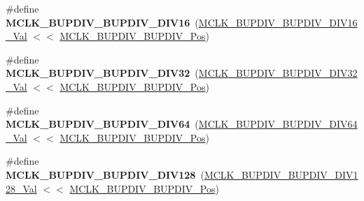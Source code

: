 \begin{DoxyCompactItemize}
\item 
\hypertarget{group___s_a_m_l21___m_c_l_k_ga5e6c89fac09e41e6353db9dd809242c8}{}\#define {\bfseries M\+C\+L\+K\+\_\+\+B\+U\+P\+D\+I\+V\+\_\+\+B\+U\+P\+D\+I\+V\+\_\+\+D\+I\+V16}~(\hyperlink{group___s_a_m_l21___m_c_l_k_ga279f3f80490b7b0270a14b9ffb710a28}{M\+C\+L\+K\+\_\+\+B\+U\+P\+D\+I\+V\+\_\+\+B\+U\+P\+D\+I\+V\+\_\+\+D\+I\+V16\+\_\+\+Val}  $<$$<$ \hyperlink{group___s_a_m_l21___m_c_l_k_ga990b49fd5adb7bbd8a9acf12cd483ae2}{M\+C\+L\+K\+\_\+\+B\+U\+P\+D\+I\+V\+\_\+\+B\+U\+P\+D\+I\+V\+\_\+\+Pos})\label{group___s_a_m_l21___m_c_l_k_ga5e6c89fac09e41e6353db9dd809242c8}

\item 
\hypertarget{group___s_a_m_l21___m_c_l_k_ga24a3d2b7f467f0ce055c5af0e564224a}{}\#define {\bfseries M\+C\+L\+K\+\_\+\+B\+U\+P\+D\+I\+V\+\_\+\+B\+U\+P\+D\+I\+V\+\_\+\+D\+I\+V32}~(\hyperlink{group___s_a_m_l21___m_c_l_k_gad1c5a99f229c470b78e648faed733586}{M\+C\+L\+K\+\_\+\+B\+U\+P\+D\+I\+V\+\_\+\+B\+U\+P\+D\+I\+V\+\_\+\+D\+I\+V32\+\_\+\+Val}  $<$$<$ \hyperlink{group___s_a_m_l21___m_c_l_k_ga990b49fd5adb7bbd8a9acf12cd483ae2}{M\+C\+L\+K\+\_\+\+B\+U\+P\+D\+I\+V\+\_\+\+B\+U\+P\+D\+I\+V\+\_\+\+Pos})\label{group___s_a_m_l21___m_c_l_k_ga24a3d2b7f467f0ce055c5af0e564224a}

\item 
\hypertarget{group___s_a_m_l21___m_c_l_k_gad85392a9bdc99ead9e74afcaec6cff38}{}\#define {\bfseries M\+C\+L\+K\+\_\+\+B\+U\+P\+D\+I\+V\+\_\+\+B\+U\+P\+D\+I\+V\+\_\+\+D\+I\+V64}~(\hyperlink{group___s_a_m_l21___m_c_l_k_gab7bf2544525ba0a186073d360323d96f}{M\+C\+L\+K\+\_\+\+B\+U\+P\+D\+I\+V\+\_\+\+B\+U\+P\+D\+I\+V\+\_\+\+D\+I\+V64\+\_\+\+Val}  $<$$<$ \hyperlink{group___s_a_m_l21___m_c_l_k_ga990b49fd5adb7bbd8a9acf12cd483ae2}{M\+C\+L\+K\+\_\+\+B\+U\+P\+D\+I\+V\+\_\+\+B\+U\+P\+D\+I\+V\+\_\+\+Pos})\label{group___s_a_m_l21___m_c_l_k_gad85392a9bdc99ead9e74afcaec6cff38}

\item 
\hypertarget{group___s_a_m_l21___m_c_l_k_ga584edc0fc37f85132a13749053338e65}{}\#define {\bfseries M\+C\+L\+K\+\_\+\+B\+U\+P\+D\+I\+V\+\_\+\+B\+U\+P\+D\+I\+V\+\_\+\+D\+I\+V128}~(\hyperlink{group___s_a_m_l21___m_c_l_k_ga5535fc6657d52b803831d35ac47a03e5}{M\+C\+L\+K\+\_\+\+B\+U\+P\+D\+I\+V\+\_\+\+B\+U\+P\+D\+I\+V\+\_\+\+D\+I\+V128\+\_\+\+Val} $<$$<$ \hyperlink{group___s_a_m_l21___m_c_l_k_ga990b49fd5adb7bbd8a9acf12cd483ae2}{M\+C\+L\+K\+\_\+\+B\+U\+P\+D\+I\+V\+\_\+\+B\+U\+P\+D\+I\+V\+\_\+\+Pos})\label{group___s_a_m_l21___m_c_l_k_ga584edc0fc37f85132a13749053338e65}


\end{DoxyCompactItemize}
